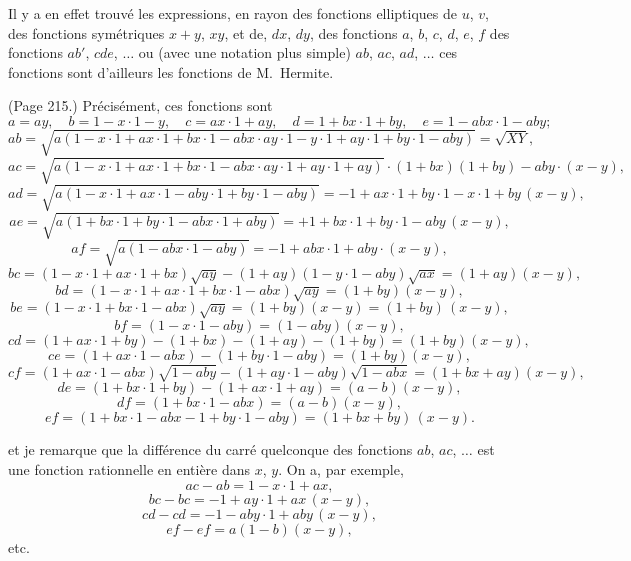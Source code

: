 \documentclass[11pt,a4paper]{book}
\begin{document}
Il y a en effet trouv\'e les expressions, en rayon des fonctions elliptiques de $u$, $v$, des fonctions sym\'etriques $x + y$, $xy$, et de, $dx$, $dy$, des fonctions $a$, $b$, $c$, $d$, $e$, $f$ des fonctions $ab'$, $cde$, $\ldots$ ou (avec une notation plus simple) $ab$, $ac$, $ad$, $\ldots$ ces fonctions sont d'ailleurs les fonctions de M.~Hermite.

\medskip

\noindent (Page 215.) Pr\'ecis\'ement, ces fonctions sont
\[
a = a y, \quad b = 1 - x \cdot 1 - y, \quad c = ax\cdot 1 + ay, \quad d = 1 + bx\cdot 1 + by, \quad e = 1 - abx\cdot 1 - aby;
\]
\[
ab = \sqrt{a(1 - x\cdot 1 + ax\cdot 1 + bx\cdot 1 - abx\cdot ay\cdot 1 - y\cdot 1 + ay\cdot 1 + by\cdot 1 - aby)} = \sqrt{XY},
\]
\[
ac = \sqrt{a(1 - x\cdot 1 + ax\cdot 1 + bx\cdot 1 - abx\cdot ay\cdot 1 + ay\cdot 1 + ay)} \cdot (1 + bx) (1 + by) - aby \cdot (x - y),
\]
\[
ad = \sqrt{a(1 - x\cdot 1 + ax\cdot 1 - aby\cdot 1 + by\cdot 1 - aby)} = -1 + a x\cdot 1 + by\cdot 1 - x \cdot 1 + by\,(x - y),
\]
\[
ae = \sqrt{a(1 + bx\cdot 1 + by\cdot 1 - abx\cdot 1 + aby)} = + 1 + bx\cdot 1 + by\cdot 1 - aby\,(x - y),
\]
\[
af = \sqrt{a(1 - abx\cdot 1 - aby)} = - 1 + abx \cdot 1 + aby \cdot (x - y),
\]
\[
bc = (1 - x\cdot 1 + ax\cdot 1 + bx)\sqrt{ay} - (1 + ay)(1 - y\cdot 1 - aby)\sqrt{ax} = (1 + ay)(x - y),
\]
\[
bd = (1 - x\cdot 1 + ax\cdot 1 + bx\cdot 1 - abx)\sqrt{ay} = (1 + by)(x - y),
\]
\[
be = (1 - x\cdot 1 + bx\cdot 1 - abx)\sqrt{ay} = (1 + by) (x - y) = (1 + by)\,(x - y),
\]
\[
bf = (1 - x\cdot 1 - aby) = (1 - aby)(x - y),
\]
\[
cd = (1 + ax\cdot 1 + by) - (1 + bx) - (1 + ay) - (1 + by) = (1 + by)(x - y),
\]
\[
ce = (1 + ax\cdot 1 - abx) - (1 + by\cdot 1 - aby) = (1 + by)(x - y),
\]
\[
cf = (1 + ax\cdot 1 - abx)\sqrt{1 - aby} - (1 + ay\cdot 1 - aby)\sqrt{1 - abx} = (1 + bx + ay)(x - y),
\]
\[
de = (1 + bx\cdot 1 + by) - (1 + ax\cdot 1 + ay) = (a - b)(x - y),
\]
\[
df = (1 + bx\cdot 1 - abx) = (a - b)(x - y),
\]
\[
ef = (1 + bx\cdot 1 - abx - 1 + by\cdot 1 - aby) = (1 + bx + by)\,(x - y).
\]

et je remarque que la diff\'erence du carr\'e quelconque des fonctions $ab$, $ac$, $\ldots$ est une fonction rationnelle en enti\`ere dans $x$, $y$. On a, par exemple,
\[
ac - ab = 1 - x\cdot 1 + ax,
\]
\[
bc - bc = - 1 + ay\cdot 1 + ax\,(x - y),
\]
\[
cd - cd = - 1 - aby\cdot 1 + aby\,(x - y),
\]
\[
ef - ef = a (1 - b)(x - y),
\]
etc.
\end{document}
